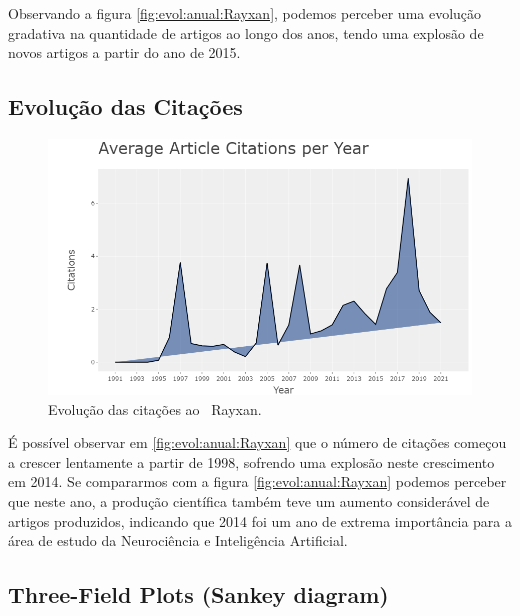 Observando a figura \ref{fig:evol:anual:Rayxan}, podemos perceber uma evolução gradativa na quantidade de artigos ao longo dos anos, tendo uma explosão de novos artigos a partir do ano de 2015.

\subsection{Evolução das Citações}

\begin{figure}
    \centering
    \includegraphics[width=1\textwidth]{experiments/Rayxan/PesqBibliogr/ComputacaoQuantica/WoS-20220206/AverageCitations.png}
    \caption{Evolução das citações ao \dataset\   Rayxan.}
    \label{fig:cit:anual:Rayxan}
\end{figure}

É possível observar em \ref{fig:evol:anual:Rayxan} que o número de citações começou a crescer lentamente a partir de 1998, sofrendo uma explosão neste crescimento em 2014. Se compararmos com a figura \ref{fig:evol:anual:Rayxan} podemos perceber que neste ano, a produção científica também teve um aumento considerável de artigos produzidos, indicando que 2014 foi um ano de extrema importância para a área de estudo da Neurociência e Inteligência Artificial.

\subsection{Three-Field Plots (Sankey diagram)}

